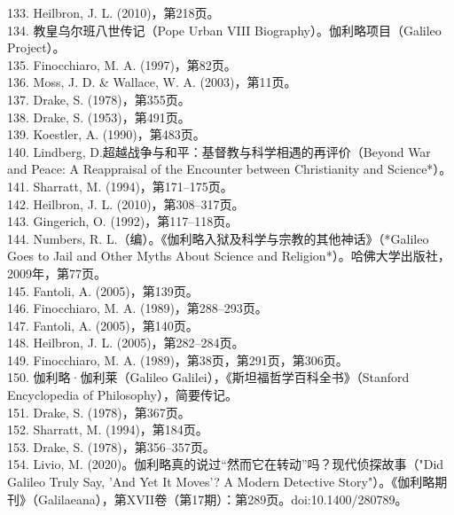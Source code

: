 133. Heilbron, J. L. (2010)，第218页。\\
134. 教皇乌尔班八世传记（Pope Urban VIII Biography）。伽利略项目（Galileo Project）。\\
135. Finocchiaro, M. A. (1997)，第82页。\\ 
136. Moss, J. D. & Wallace, W. A. (2003)，第11页。\\
137. Drake, S. (1978)，第355页。\\
138. Drake, S. (1953)，第491页。\\
139. Koestler, A. (1990)，第483页。\\
140. Lindberg, D.超越战争与和平：基督教与科学相遇的再评价（Beyond War and Peace: A Reappraisal of the Encounter between Christianity and Science*）。\\
141. Sharratt, M. (1994)，第171–175页。\\
142. Heilbron, J. L. (2010)，第308–317页。\\
143. Gingerich, O. (1992)，第117–118页。\\
144. Numbers, R. L.（编）。《伽利略入狱及科学与宗教的其他神话》（*Galileo Goes to Jail and Other Myths About Science and Religion*）。哈佛大学出版社，2009年，第77页。 \\
145. Fantoli, A. (2005)，第139页。\\
146. Finocchiaro, M. A. (1989)，第288–293页。\\
147. Fantoli, A. (2005)，第140页。\\
148. Heilbron, J. L. (2005)，第282–284页。\\
149. Finocchiaro, M. A. (1989)，第38页，第291页，第306页。\\
150. 伽利略·伽利莱（Galileo Galilei），《斯坦福哲学百科全书》（Stanford Encyclopedia of Philosophy），简要传记。\\
151. Drake, S. (1978)，第367页。\\
152. Sharratt, M. (1994)，第184页。\\
153. Drake, S. (1978)，第356–357页。\\
154. Livio, M. (2020)。伽利略真的说过“然而它在转动”吗？现代侦探故事（"Did Galileo Truly Say, 'And Yet It Moves'? A Modern Detective Story"）。《伽利略期刊》（Galilaeana），第XVII卷（第17期）：第289页。doi:10.1400/280789。\\